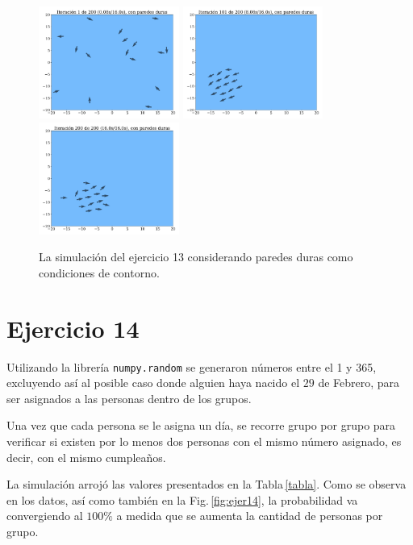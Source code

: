 \begin{figure}[H]
	\centering
	\includegraphics[width=0.41\textwidth]{ejer_13_0True.pdf}
	\includegraphics[width=0.41\textwidth]{ejer_13_100True.pdf}
	\includegraphics[width=0.41\textwidth]{ejer_13_199True.pdf}
	\caption{La simulación del ejercicio 13 considerando paredes duras como condiciones de contorno.}
	\label{fig:ejer13_con}
\end{figure}

\section*{Ejercicio 14}

Utilizando  la librería  \verb|numpy.random| se generaron números entre el 1 y 365, excluyendo así al posible caso donde alguien haya nacido el $29$ de Febrero, para ser asignados a las personas dentro de los grupos.

Una vez que cada persona se le asigna un día, se recorre grupo por grupo para verificar si existen por lo menos dos personas con el mismo número asignado, es decir, con el mismo cumpleaños.

La simulación arrojó las valores presentados en la Tabla\,\ref{tabla}. Como se observa en los datos, así como también en la Fig.\,\ref{fig:ejer14}, la probabilidad va convergiendo al $100\%$ a medida que se aumenta la cantidad de personas por grupo.

